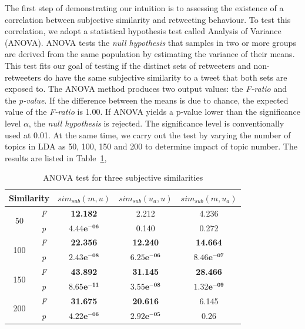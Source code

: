 \documentclass[letterpaper]{article}
\begin{document}
The first step of demonstrating our intuition is to assessing the existence of a correlation between subjective similarity and retweeting behaviour. 
To test this correlation, we adopt a statistical hypothesis test called Analysis of Variance (ANOVA). 
ANOVA tests the \textit{null hypothesis} that samples in two or more groups are derived from the same population by estimating the variance of their means. This test fits our goal of testing if the distinct sets of retweeters and non-retweeters do have the same subjective similarity to a tweet that both sets are exposed to. 
The ANOVA method produces two output values: the \textit{F-ratio} and the \textit{p-value}. 
If the difference between the means is due to chance, the expected value of the \textit{F-ratio} is 1.00. 
If ANOVA yields a p-value lower than the significance level $ \alpha $, the \textit{null hypothesis} is rejected. 
The significance level is conventionally used at 0.01.
At the same time, we carry out the test by varying the number of topics in LDA as 50, 100, 150 and 200 to determine impact of topic number. 
The results are listed in Table~\ref{tab2}, 
\begin{table}[h]
\scriptsize
\centering
\caption{ANOVA test for three subjective similarities}
\label{tab2}
\begin{tabular}{|c|c|c|c|c|}
\hline
\multicolumn{2}{|c|}{Similarity}& $ sim_{sub} \left( m,u \right) $ & $ sim_{sub}\left( u_{a},u \right)  $ & $ sim_{sub}\left( m,u_{a} \right)  $\\
\hline
\multirow{2}{*}{50} & \textit{F} & \textbf{12.182} & 2.212 & 4.236 \\
\cline{2-5}
  & \textit{p} &  $\mathbf{4.44e^{-06}}$  & 0.140 & 0.272\\
\hline
\multirow{2}{*}{100} & \textit{F} & \textbf{22.356} & \textbf{12.240} & \textbf{14.664} \\
\cline{2-5}
  & \textit{p} &  $\mathbf{2.43e^{-08}}$  & $\mathbf{6.25e^{-06}}$ & $\mathbf{8.46e^{-07}}$\\
\hline
\multirow{2}{*}{150} & \textit{F} & \textbf{43.892} & \textbf{31.145} & \textbf{28.466} \\
\cline{2-5}
  & \textit{p} &  $\mathbf{8.65e^{-11}}$  & $\mathbf{3.55e^{-08}}$ & $\mathbf{1.32e^{-09}}$\\
\hline
\multirow{2}{*}{200} & \textit{F} & \textbf{31.675} & \textbf{20.616} & 6.145\\
\cline{2-5}
  & \textit{p} &  $\mathbf{4.22e^{-06}}$  & $\mathbf{2.92e^{-05}}$ & 0.26\\
\hline
\end{tabular}
\end{table}
\end{document}

